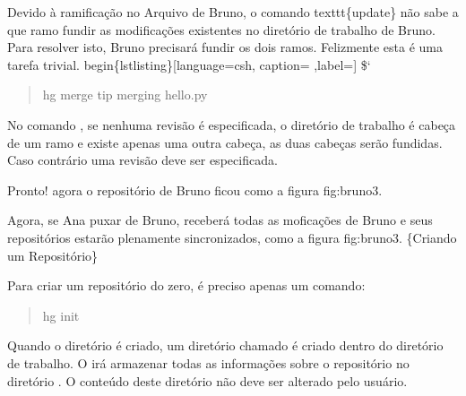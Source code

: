 \documentclass[a4paper,10pt,portuguese]{sphinxmanual}
\begin{document}
Devido à ramificação no Arquivo de Bruno, o comando texttt\{update\} não sabe a que ramo fundir as modificações existentes no diretório de trabalho de Bruno. Para resolver isto, Bruno precisará fundir os dois ramos. Felizmente esta é uma tarefa trivial.
begin\{lstlisting\}{[}language=csh, caption= ,label={]}
\${}`
\begin{quote}

hg merge tip merging hello.py
\end{quote}

No comando , se nenhuma revisão é especificada, o
diretório de trabalho é cabeça de um ramo e existe apenas uma outra
cabeça, as duas cabeças serão fundidas. Caso contrário uma revisão
deve ser especificada.

Pronto! agora o repositório de Bruno ficou como a figura
fig:bruno3.

Agora, se Ana puxar de Bruno, receberá todas as moficações de Bruno
e seus repositórios estarão plenamente sincronizados, como a figura
fig:bruno3. \{Criando um Repositório\}

Para criar um repositório do zero, é preciso apenas um comando:
\begin{quote}

hg init
\end{quote}

Quando o diretório é criado, um diretório chamado  é criado
dentro do diretório de trabalho. O  irá armazenar
todas as informações sobre o repositório no diretório . O
conteúdo deste diretório não deve ser alterado pelo usuário.
\end{document}
